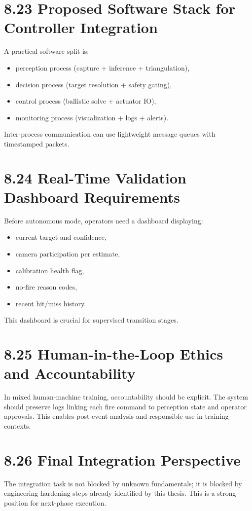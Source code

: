 \section{8.23 Proposed Software Stack for Controller Integration}
A practical software split is:
\begin{itemize}
  \item perception process (capture + inference + triangulation),
  \item decision process (target resolution + safety gating),
  \item control process (ballistic solve + actuator IO),
  \item monitoring process (visualization + logs + alerts).
\end{itemize}

Inter-process communication can use lightweight message queues with timestamped packets.

\section{8.24 Real-Time Validation Dashboard Requirements}
Before autonomous mode, operators need a dashboard displaying:
\begin{itemize}
  \item current target and confidence,
  \item camera participation per estimate,
  \item calibration health flag,
  \item no-fire reason codes,
  \item recent hit/miss history.
\end{itemize}

This dashboard is crucial for supervised transition stages.

\section{8.25 Human-in-the-Loop Ethics and Accountability}
In mixed human-machine training, accountability should be explicit. The system should preserve logs linking each fire command to perception state and operator approvals. This enables post-event analysis and responsible use in training contexts.

\section{8.26 Final Integration Perspective}
The integration task is not blocked by unknown fundamentals; it is blocked by engineering hardening steps already identified by this thesis. This is a strong position for next-phase execution.
